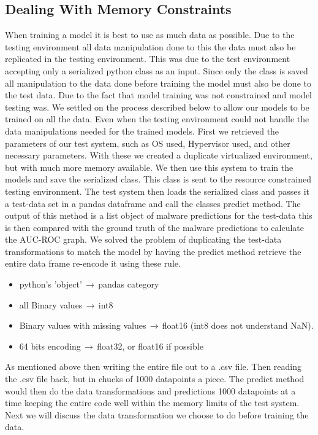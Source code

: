 \documentclass[sigconf]{acmart}
\begin{document}
\subsection{Dealing With Memory Constraints}
When training a model it is best to use as much data as possible. Due to the testing environment all data manipulation done to this the data must also be replicated in the testing environment. This was due to the test environment accepting only a serialized python class as an input. Since only the class is saved all manipulation to the data done before training the model must also be done to the test data. Due to the fact that model training was not constrained and model testing was. We settled on the process described below to allow our models to be trained on all the data. Even when the testing environment could not handle the data manipulations needed for the trained models. First we retrieved the parameters of our test system, such as OS used, Hypervisor used, and other necessary parameters. With these we created a duplicate virtualized environment, but with much more memory available. We then use this system to train the models and save the serialized class. This class is sent to the resource constrained testing environment. The test system then loads the serialized class and passes it a test-data set in a pandas dataframe and call the classes predict method. The output of this method is a list object of malware predictions for the test-data this is then compared with the ground truth of the malware predictions to calculate the AUC-ROC graph. We solved the problem of duplicating the test-data transformations to match the model by having the predict method retrieve the entire data frame re-encode it using these rule. 
\begin{itemize}
\item python's 'object'$\,\to\,$pandas category
\item all Binary values$\,\to\,$int8
\item Binary values with missing values$\,\to\,$float16 (int8 does not understand NaN).
\item 64 bits encoding$\,\to\,$float32, or float16 if possible
\end{itemize}
As mentioned above then writing the entire file out to a .csv file. Then reading the .csv file back, but in chucks of 1000 datapoints a piece. The predict method would then do the data transformations and predictions 1000 datapoints at a time keeping the entire code well within the memory limits of the test system. Next we will discuss the data transformation we choose to do before training the data.
\end{document}

